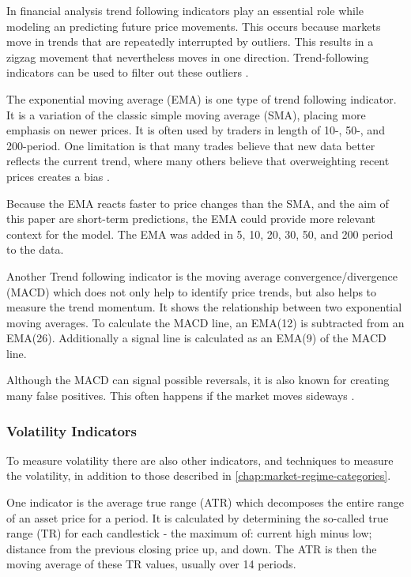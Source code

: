 In financial analysis trend following indicators play an essential role while modeling an predicting future price movements.
This occurs because markets move in trends that are repeatedly interrupted by outliers.
This results in a zigzag movement that nevertheless moves in one direction.
Trend-following indicators can be used to filter out these outliers \cite{investopia-trend-indicators}.

The exponential moving average (EMA) is one type of trend following indicator.
It is a variation of the classic simple moving average (SMA), placing more emphasis on newer prices.
It is often used by traders in length of 10-, 50-, and 200-period.
One limitation is that many trades believe that new data better reflects the current trend, where many others believe that overweighting recent prices creates a bias \cite{investopia-ema}.


Because the EMA reacts faster to price changes than the SMA, and the aim of this paper are short-term predictions, the EMA could provide more relevant context for the model.
The EMA was added in 5, 10, 20, 30, 50, and 200 period to the data.

Another Trend following indicator is the moving average convergence/divergence (MACD) which does not only help to identify price trends, but also helps to measure the trend momentum.
It shows the relationship between two exponential moving averages.
To calculate the MACD line, an EMA(12) is subtracted from an EMA(26).
Additionally a signal line is calculated as an EMA(9) of the MACD line.

Although the MACD can signal possible reversals, it is also known for creating many false positives.
This often happens if the market moves sideways \cite{investopia-macd}.

\subsubsection{Volatility Indicators}

To measure volatility there are also other indicators, and techniques to measure the volatility, in addition to those described in \autoref{chap:market-regime-categories}.

One indicator is the average true range (ATR) which decomposes the entire range of an asset price for a period.
It is calculated by determining the so-called true range (TR) for each candlestick - the maximum of: current high minus low; distance from the previous closing price up, and down.
The ATR is then the moving average of these TR values, usually over 14 periods.


